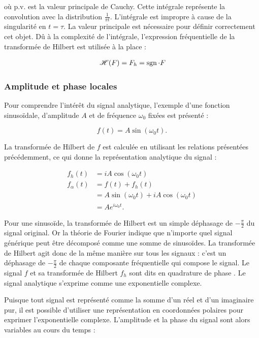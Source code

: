 où p.v. est la valeur principale de Cauchy. Cette intégrale représente la convolution avec la distribution $\frac 1{\pi t}$. L'intégrale est impropre à cause de la singularité en $t=\tau$. La valeur principale est nécessaire pour définir correctement cet objet. Dû à la complexité de l'intégrale, l'expression fréquentielle de la transformée de Hilbert est utilisée à la place :

\begin{align*}
    &\operatorname{\mathscr{H}}(F) = F_h = \operatorname{sgn}\cdot F \\
\end{align*}


\subsubsection{Amplitude et phase locales}

Pour comprendre l'intérêt du signal analytique, l'exemple d'une fonction sinusoïdale, d'amplitude $A$ et de fréquence $\omega_0$ fixées est présenté :

\begin{equation}
    f(t) = A\sin(\omega_0t).
\end{equation}

La transformée de Hilbert de $f$ est calculée en utilisant les relations présentées précédemment, ce qui donne la représentation analytique du signal :

\begin{align}
    f_h(t) &= iA\cos(\omega_0t) \\
    f_{\alpha}(t) &= f(t) + f_h(t) \\
    &= A\sin(\omega_0t)+iA\cos(\omega_0t) \\
    &= Ae^{i\omega_0t}.
\end{align}

Pour une sinusoïde, la transformée de Hilbert est un simple déphasage de $-\frac{\pi}2$ du signal original. Or la théorie de Fourier indique que n'importe quel signal générique peut être décomposé comme une somme de sinusoïdes. La transformée de Hilbert agit donc de la même manière sur tous les signaux : c'est un déphasage de $-\frac{\pi}2$ de chaque composante fréquentielle qui compose le signal. Le signal $f$ et sa transformée de Hilbert $f_h$ sont dits en \og quadrature de phase \fg. Le signal analytique s'exprime comme une exponentielle complexe.

\bigskip

Puisque tout signal est représenté comme la somme d'un réel et d'un imaginaire pur, il est possible d'utiliser une représentation en coordonnées polaires pour exprimer l'exponentielle complexe. L'amplitude et la phase du signal sont alors variables au cours du temps :

